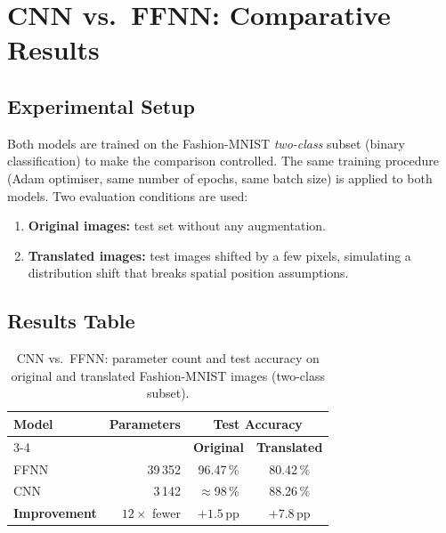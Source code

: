 \documentclass[12pt,a4paper]{article}
\begin{document}
\section{CNN vs.\ FFNN: Comparative Results}
\label{sec:results}

\subsection{Experimental Setup}
\label{subsec:exp_setup}

Both models are trained on the Fashion-MNIST \emph{two-class} subset
(binary classification) to make the comparison controlled.  The same
training procedure (Adam optimiser, same number of epochs, same batch size)
is applied to both models.  Two evaluation conditions are used:

\begin{enumerate}[label=\arabic*.]
  \item \textbf{Original images:} test set without any augmentation.
  \item \textbf{Translated images:} test images shifted by a few pixels,
        simulating a distribution shift that breaks spatial position
        assumptions.
\end{enumerate}

\subsection{Results Table}
\label{subsec:results_table}

\begin{table}[ht]
\centering
\caption{CNN vs.\ FFNN: parameter count and test accuracy on original
         and translated Fashion-MNIST images (two-class subset).}
\label{tab:cnn_vs_ffnn}
\begin{tabular}{lrcc}
\toprule
\multirow{2}{*}{\textbf{Model}} &
\multirow{2}{*}{\textbf{Parameters}} &
\multicolumn{2}{c}{\textbf{Test Accuracy}} \\
\cmidrule(lr){3-4}
 & & \textbf{Original} & \textbf{Translated} \\
\midrule
FFNN  & 39\,352 & 96.47\,\%  & 80.42\,\% \\
CNN   & 3\,142  & $\approx$98\,\%  & 88.26\,\% \\
\midrule
\textbf{Improvement} & $12\times$ fewer & $+1.5$\,pp & $+7.8$\,pp \\
\bottomrule
\end{tabular}
\end{table}
\end{document}
